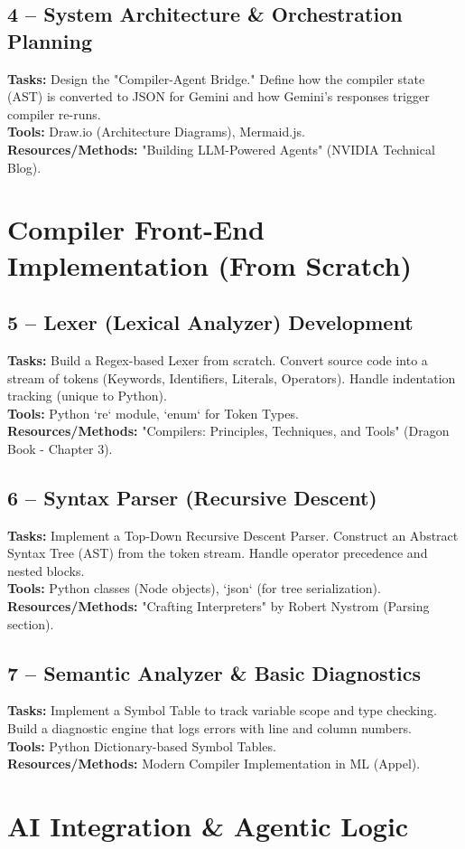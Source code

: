 \documentclass[a4paper,11pt]{article}
\newcommand{\weekdetail}[3]{
    \textbf{Tasks:} #1 \\
    \textbf{Tools:} #2 \\
    \textbf{Resources/Methods:} #3 \\
}
\begin{document}
\subsection{4 -- System Architecture \& Orchestration Planning}
\weekdetail{
    Design the "Compiler-Agent Bridge." Define how the compiler state (AST) is converted to JSON for Gemini and how Gemini's responses trigger compiler re-runs.
}{
    Draw.io (Architecture Diagrams), Mermaid.js.
}{
    "Building LLM-Powered Agents" (NVIDIA Technical Blog).
}

\section{Compiler Front-End Implementation (From Scratch)}

\subsection{5 -- Lexer (Lexical Analyzer) Development}
\weekdetail{
    Build a Regex-based Lexer from scratch. Convert source code into a stream of tokens (Keywords, Identifiers, Literals, Operators). Handle indentation tracking (unique to Python).
}{
    Python `re` module, `enum` for Token Types.
}{
    "Compilers: Principles, Techniques, and Tools" (Dragon Book - Chapter 3).
}

\subsection{6 -- Syntax Parser (Recursive Descent)}
\weekdetail{
    Implement a Top-Down Recursive Descent Parser. Construct an Abstract Syntax Tree (AST) from the token stream. Handle operator precedence and nested blocks.
}{
    Python classes (Node objects), `json` (for tree serialization).
}{
    "Crafting Interpreters" by Robert Nystrom (Parsing section).
}

\subsection{7 -- Semantic Analyzer \& Basic Diagnostics}
\weekdetail{
    Implement a Symbol Table to track variable scope and type checking. Build a diagnostic engine that logs errors with line and column numbers.
}{
    Python Dictionary-based Symbol Tables.
}{
    Modern Compiler Implementation in ML (Appel).
}

\section{AI Integration \& Agentic Logic}
\end{document}
